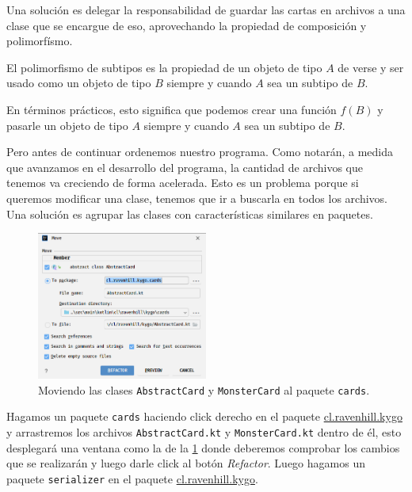   Una solución es delegar la responsabilidad de guardar las cartas en archivos a una clase que se 
  encargue de eso, aprovechando la propiedad de composición y polimorfísmo.

  \begin{defaultbox}
    El polimorfismo de subtipos es la propiedad de un objeto de tipo \(A\) de verse y ser usado como
    un objeto de tipo \(B\) siempre y cuando \(A\) sea un subtipo de \(B\).
  \end{defaultbox}

  En términos prácticos, esto significa que podemos crear una función \(f(B)\) y pasarle un objeto
  de tipo \(A\) siempre y cuando \(A\) sea un subtipo de \(B\).

  Pero antes de continuar ordenemos nuestro programa.
  Como notarán, a medida que avanzamos en el desarrollo del programa, la cantidad de archivos que
  tenemos va creciendo de forma acelerada.
  Esto es un problema porque si queremos modificar una clase, tenemos que ir a buscarla en todos
  los archivos.
  Una solución es agrupar las clases con características similares en paquetes.

  \begin{figure}[ht!]
    \centering
    \includegraphics[width=0.5\textwidth]{img/oop/principios/clases_abstractas/idea64_move.png}
    \caption{Moviendo las clases \texttt{AbstractCard} y \texttt{MonsterCard} al paquete \texttt{cards}.}
    \label{fig:oop:principios:clases_abstractas:move}
  \end{figure}

  Hagamos un paquete \texttt{cards} haciendo click derecho en el paquete 
  \url{cl.ravenhill.kygo} y arrastremos los archivos \texttt{AbstractCard.kt} y
  \texttt{MonsterCard.kt} dentro de él, esto desplegará una ventana como la de la 
  \cref{fig:oop:principios:clases_abstractas:move} donde deberemos comprobar los cambios que se
  realizarán y luego darle click al botón \textit{Refactor}.
  Luego hagamos un paquete \texttt{serializer} en el paquete \url{cl.ravenhill.kygo}.

